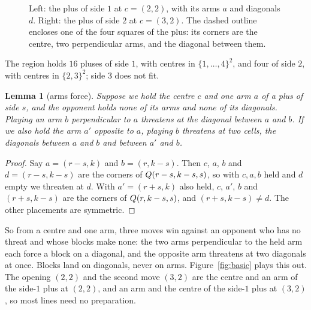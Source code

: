 \documentclass[11pt]{amsart}
\newtheorem{lemma}[theorem]{Lemma}
\theoremstyle{definition}
\theoremstyle{remark}
\begin{document}
\begin{figure}[ht]
\centering
{}
\hspace{2em}
\caption{Left: the plus of side $1$ at $c = (2,2)$, with its arms $a$
and diagonals $d$. Right: the plus of side $2$ at $c = (3,2)$. The
dashed outline encloses one of the four squares of the plus: its
corners are the centre, two perpendicular arms, and the diagonal
between them.}
\label{fig:anatomy}
\end{figure}

The region holds $16$ pluses of side $1$, with centres in
$\{1,\dots,4\}^2$, and four of side $2$, with centres in
$\{2,3\}^2$; side $3$ does not fit.

\begin{lemma}[arms force]\label{lem:arms}
Suppose we hold the centre $c$ and one arm $a$ of a plus of side $s$,
and the opponent holds none of its arms and none of its diagonals.
Playing an arm $b$ perpendicular to $a$ threatens at the diagonal
between $a$ and $b$. If we also hold the arm $a'$ opposite to $a$,
playing $b$ threatens at two cells, the diagonals between $a$ and $b$
and between $a'$ and $b$.
\end{lemma}

\begin{proof}
Say $a = (r-s,k)$ and $b = (r,k-s)$. Then $c$, $a$, $b$ and
$d = (r-s,k-s)$ are the corners of $Q(r-s,k-s,s)$, so with $c, a, b$
held and $d$ empty we threaten at $d$. With $a' = (r+s,k)$ also held,
$c$, $a'$, $b$ and $(r+s,k-s)$ are the corners of $Q(r,k-s,s)$, and
$(r+s,k-s) \ne d$. The other placements are symmetric.
\end{proof}

So from a centre and one arm, three moves win against an opponent who
has no threat and whose blocks make none: the two arms perpendicular
to the held arm each force a block on a diagonal, and the opposite arm
threatens at two diagonals at once. Blocks land on diagonals, never
on arms. Figure~\ref{fig:basic} plays this out. The opening $(2,2)$
and the second move $(3,2)$ are the centre and an arm of the side-$1$
plus at $(2,2)$, and an arm and the centre of the side-$1$ plus at
$(3,2)$, so most lines need no preparation.
\end{document}
